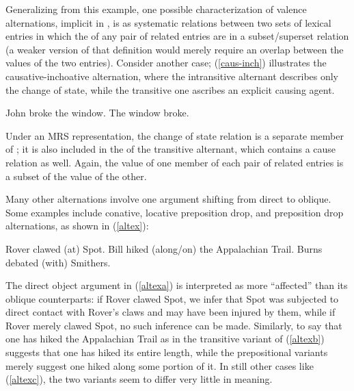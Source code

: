 \documentclass[output=paper
 	        ,biblatex
                ,babelshorthands
                ,newtxmath
                ,draftmode
                ,colorlinks, citecolor=brown
]{langscibook}
\begin{document}
Generalizing from this example, one possible characterization of valence alternations, implicit in \citet{KoenigandDavis2006}, is as systematic relations between two sets of lexical entries in which the \rels of any pair of related entries are in a subset/superset relation (a weaker version of that definition would merely require an overlap between the \rels values of the two entries). 
Consider another case; (\ref{caus-inch}) illustrates the causative-inchoative alternation, where the intransitive alternant describes only the change of state, while the transitive one ascribes an explicit causing agent.

\begin{exe}
\ex\label{caus-inch}
\begin{xlist}
	\ex\label{caus-inch-a}John broke the window.
	\ex\label{caus-inch-b}The window broke.
\end{xlist}	
\end{exe}

\noindent
Under an MRS representation, the change of state relation is a separate member of \rels; it is also included in the \rels of the transitive alternant, which contains a cause relation as well.
Again, the \rels value of one member of each pair of related entries is a subset of the \rels value of the other.

Many other alternations involve one argument shifting from direct to oblique.
Some  examples include conative, locative preposition drop, and  preposition drop alternations, as shown in (\ref{altex}):

\begin{exe}\ex\label{altex}
\begin{xlist}
\ex \label{altexa} Rover clawed (at) Spot. 
\ex \label{altexb} Bill hiked (along/on) the Appalachian Trail.
\ex \label{altexc} Burns debated (with) Smithers.
\end{xlist}
\end{exe}

\noindent
The direct object argument in (\ref{altexa}) is interpreted as more ``affected'' than its oblique counterparts:  if Rover clawed Spot, we infer that Spot was subjected to direct contact with Rover's claws and may have been injured by them, while if Rover merely clawed  Spot, no such inference can be made.
Similarly, to say that one has hiked the Appalachian Trail as in the transitive variant of (\ref{altexb}) suggests that one has hiked its entire length, while the prepositional variants merely suggest one hiked along some portion of it.  In still other cases like (\ref{altexc}), the two variants seem to differ very little in meaning.  
\end{document}
